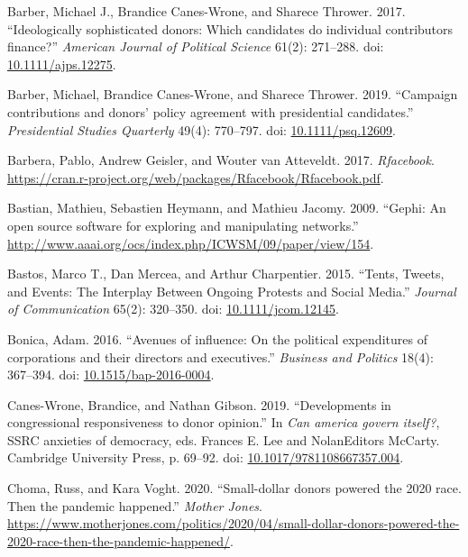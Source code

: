 \documentclass[12pt,]{article}
\newlength{\cslhangindent}
\newenvironment{CSLReferences}[2]%
    {\setlength{\parindent}{0pt}%
    \everypar{\setlength{\hangindent}{\cslhangindent}}\ignorespaces}%
    {\par}
\begin{document}
\begin{CSLReferences}{1}{0}
\leavevmode{}%
Barber, Michael J., Brandice Canes-Wrone, and Sharece Thrower. 2017.
{``Ideologically sophisticated donors: Which candidates do individual
contributors finance?''} \emph{American Journal of Political Science}
61(2): 271--288. doi:
\href{https://doi.org/10.1111/ajps.12275}{10.1111/ajps.12275}.

\leavevmode{}%
Barber, Michael, Brandice Canes-Wrone, and Sharece Thrower. 2019.
{``Campaign contributions and donors' policy agreement with presidential
candidates.''} \emph{Presidential Studies Quarterly} 49(4): 770--797.
doi: \href{https://doi.org/10.1111/psq.12609}{10.1111/psq.12609}.

\leavevmode{}%
Barbera, Pablo, Andrew Geisler, and Wouter van Atteveldt. 2017.
\emph{Rfacebook}.
\url{https://cran.r-project.org/web/packages/Rfacebook/Rfacebook.pdf}.

\leavevmode{}%
Bastian, Mathieu, Sebastien Heymann, and Mathieu Jacomy. 2009. {``Gephi:
An open source software for exploring and manipulating networks.''}
\url{http://www.aaai.org/ocs/index.php/ICWSM/09/paper/view/154}.

\leavevmode{}%
Bastos, Marco T., Dan Mercea, and Arthur Charpentier. 2015. {``{Tents,
Tweets, and Events: The Interplay Between Ongoing Protests and Social
Media}.''} \emph{Journal of Communication} 65(2): 320--350. doi:
\href{https://doi.org/10.1111/jcom.12145}{10.1111/jcom.12145}.

\leavevmode{}%
Bonica, Adam. 2016. {``Avenues of influence: On the political
expenditures of corporations and their directors and executives.''}
\emph{Business and Politics} 18(4): 367--394. doi:
\href{https://doi.org/10.1515/bap-2016-0004}{10.1515/bap-2016-0004}.

\leavevmode{}%
Canes-Wrone, Brandice, and Nathan Gibson. 2019. {``Developments in
congressional responsiveness to donor opinion.''} In \emph{Can america
govern itself?}, SSRC anxieties of democracy, eds. Frances E. Lee and
NolanEditors McCarty. Cambridge University Press, p. 69--92. doi:
\href{https://doi.org/10.1017/9781108667357.004}{10.1017/9781108667357.004}.

\leavevmode{}%
Choma, Russ, and Kara Voght. 2020. {``Small-dollar donors powered the
2020 race. Then the pandemic happened.''} \emph{Mother Jones}.
\url{https://www.motherjones.com/politics/2020/04/small-dollar-donors-powered-the-2020-race-then-the-pandemic-happened/}.


\end{CSLReferences}
\end{document}
